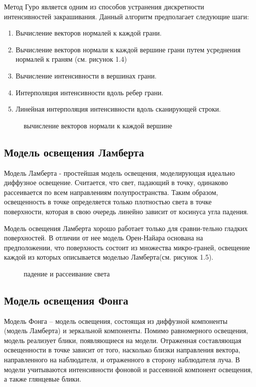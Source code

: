 Метод Гуро является одним из способов устранения дискретности интенсивностей закрашивания.
\newline\newline
Данный алгоритм предполагает следующие шаги:
\begin{enumerate}
	\item Вычисление векторов нормалей к каждой грани.
	\item Вычисление векторов нормали к каждой вершине грани путем усреднения нормалей к граням (см. рисунок 1.4)
	\item Вычисление интенсивности в вершинах грани.
	\item Интерполяция интенсивности вдоль ребер грани.
	\item Линейная интерполяция интенсивности вдоль сканирующей строки.
\end{enumerate}

\begin{figure}[h]
	\caption{вычисление векторов нормали к каждой вершине}
\end{figure}

\subsection{Модель освещения Ламберта}
Модель Ламберта \cite{lamb} - простейшая модель освещения, моделирующая идеально диффузное освещение. Считается, что свет, падающий в точку, одинаково рассеивается по всем направлениям полупространства. Таким образом, освещенность в точке определяется только плотностью света в точке поверхности, которая в свою очередь линейно зависит от косинуса угла падения.

Модель освещения Ламберта хорошо работает только для сравни-тельно гладких поверхностей. В отличии от нее модель Орен-Найара основана на предположении, что поверхность состоит из множества микро-граней, освещение каждой из которых описывается моделью Ламберта(см. рисунок 1.5).

\begin{figure}[h]
	\caption{падение и рассеивание света}
\end{figure}

\subsection{Модель освещения Фонга}
Модель Фонга \cite{fong} – модель освещения, состоящая из диффузной компоненты (модель Ламберта) и зеркальной компоненты. Помимо равномерного освещения, модель реализует блики, появляющиеся на модели. Отраженная составляющая освещенности в точке зависит от того, насколько близки направления вектора, направленного на наблюдателя, и отраженного в сторону наблюдателя луча.  
В модели учитываются интенсивности фоновой и рассеянной компонент освещения, а также глянцевые блики.

